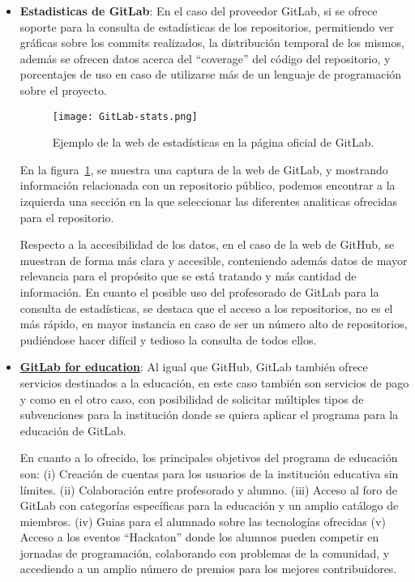 \begin{itemize}
\item \textbf{Estadisticas de GitLab}: En el caso del proveedor GitLab, si
  se ofrece soporte para la consulta de estadísticas de los repositorios,
  permitiendo ver gráficas sobre los commits realizados, la distribución
  temporal de los mismos, además se ofrecen datos acerca del ``coverage''
  del código del repositorio, y porcentajes de uso en caso de utilizarse
  más de un lenguaje de programación sobre el proyecto.

  \begin{figure}[h!]
    \texttt{[image: GitLab-stats.png]}
    \caption{Ejemplo de la web de estadísticas en la página oficial de
      GitLab.}
    \label{figure:GitLabInsights}
  \end{figure}

  En la figura~\ref{figure:GitLabInsights}, se muestra una captura de la
  web de GitLab, y mostrando información relacionada con un repositorio
  público, podemos encontrar a la izquierda una sección en la que
  seleccionar las diferentes analiticas ofrecidas para el repositorio.

  Respecto a la accesibilidad de los datos, en el caso de la web de GitHub,
  se muestran de forma más clara y accesible, conteniendo además datos de
  mayor relevancia para el propósito que se está tratando y más cantidad de
  información. En cuanto el posible uso del profesorado de GitLab para la
  consulta de estadísticas, se destaca que el acceso a los repositorios, no
  es el más rápido, en mayor instancia en caso de ser un número alto de
  repositorios, pudiéndose hacer difícil y tedioso la consulta de todos
  ellos.

\item \textbf{\href{https://about.gitlab.com/solutions/education/}{GitLab
      for education}}: Al igual que GitHub, GitLab también ofrece servicios
  destinados a la educación, en este caso también son servicios de pago y
  como en el otro caso, con posibilidad de solicitar múltiples tipos de
  subvenciones para la institución donde se quiera aplicar el programa para
  la educación de GitLab.

  En cuanto a lo ofrecido, los principales objetivos del programa de
  educación son: (i) Creación de cuentas para los usuarios de la
  institución educativa sin límites. (ii) Colaboración entre profesorado y
  alumno. (iii) Acceso al foro de GitLab con categorías específicas para la
  educación y un amplio catálogo de miembros. (iv) Guias para el alumnado
  sobre las tecnologías ofrecidas (v) Acceso a los eventos “Hackaton” donde
  los alumnos pueden competir en jornadas de programación, colaborando con
  problemas de la comunidad, y accediendo a un amplio número de premios
  para los mejores contribuidores.



\end{itemize}
